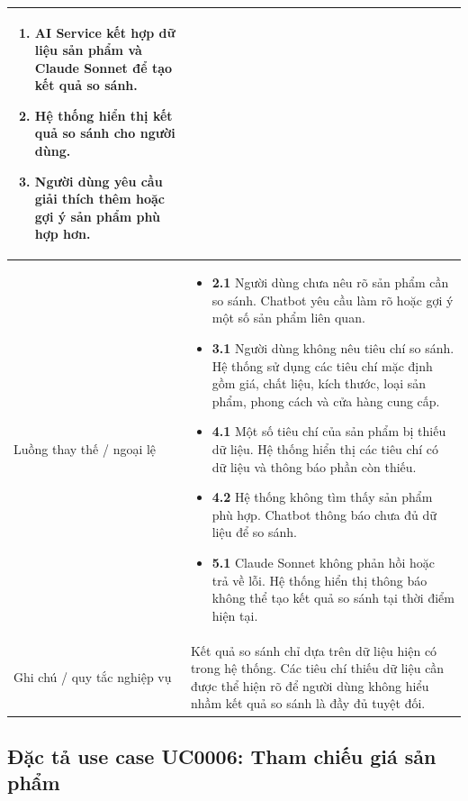 \documentclass[../DoAn.tex]{subfiles}
\begin{document}
\begin{longtable}{|p{}|p{}|}
\begin{minipage}[t]{0.68\textwidth}
\begin{enumerate}
    \item AI Service kết hợp dữ liệu sản phẩm và Claude Sonnet để tạo kết quả so sánh.
    \item Hệ thống hiển thị kết quả so sánh cho người dùng.
    \item Người dùng yêu cầu giải thích thêm hoặc gợi ý sản phẩm phù hợp hơn.
\end{enumerate}
\end{minipage}
\\
\hline
Luồng thay thế / ngoại lệ &
\begin{minipage}[t]{0.68\textwidth}
\begin{itemize}
    \item \textbf{2.1} Người dùng chưa nêu rõ sản phẩm cần so sánh. Chatbot yêu cầu làm rõ hoặc gợi ý một số sản phẩm liên quan.
    \item \textbf{3.1} Người dùng không nêu tiêu chí so sánh. Hệ thống sử dụng các tiêu chí mặc định gồm giá, chất liệu, kích thước, loại sản phẩm, phong cách và cửa hàng cung cấp.
    \item \textbf{4.1} Một số tiêu chí của sản phẩm bị thiếu dữ liệu. Hệ thống hiển thị các tiêu chí có dữ liệu và thông báo phần còn thiếu.
    \item \textbf{4.2} Hệ thống không tìm thấy sản phẩm phù hợp. Chatbot thông báo chưa đủ dữ liệu để so sánh.
    \item \textbf{5.1} Claude Sonnet không phản hồi hoặc trả về lỗi. Hệ thống hiển thị thông báo không thể tạo kết quả so sánh tại thời điểm hiện tại.
\end{itemize}
\end{minipage}
\\
\hline
Ghi chú / quy tắc nghiệp vụ & Kết quả so sánh chỉ dựa trên dữ liệu hiện có trong hệ thống. Các tiêu chí thiếu dữ liệu cần được thể hiện rõ để người dùng không hiểu nhầm kết quả so sánh là đầy đủ tuyệt đối. \\
\hline
\end{longtable}

\subsection{Đặc tả use case UC0006: Tham chiếu giá sản phẩm}
\label{subsection:2.3.6}
\end{document}
